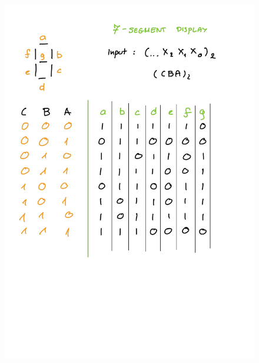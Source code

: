 \documentclass[14pt, table]{extarticle}
\begin{document}
\newpage
\begin{figure}[H]
\includegraphics[scale=0.2]{Elektronika-21}
\centering
\captionsetup{labelformat=empty}
\caption{}
\end{figure}
\end{document}

